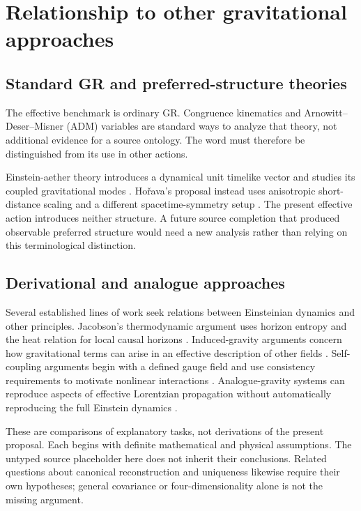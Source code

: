 \documentclass[11pt]{article}
\begin{document}
\section{Relationship to other gravitational approaches}
\subsection{Standard GR and preferred-structure theories}
The effective benchmark is ordinary GR. Congruence kinematics and Arnowitt--Deser--Misner (ADM) variables are standard ways to analyze that theory, not additional evidence for a source ontology. The word \Aether{} must therefore be distinguished from its use in other actions.

Einstein-aether theory introduces a dynamical unit timelike vector and studies its coupled gravitational modes \parencite{JacobsonMattingly2001,JacobsonMattingly2004}. Ho\v{r}ava's proposal instead uses anisotropic short-distance scaling and a different spacetime-symmetry setup \parencite{Horava2009}. The present effective action introduces neither structure. A future source completion that produced observable preferred structure would need a new analysis rather than relying on this terminological distinction.

\subsection{Derivational and analogue approaches}
Several established lines of work seek relations between Einsteinian dynamics and other principles. Jacobson's thermodynamic argument uses horizon entropy and the heat relation for local causal horizons \parencite{Jacobson1995}. Induced-gravity arguments concern how gravitational terms can arise in an effective description of other fields \parencite{Visser2002}. Self-coupling arguments begin with a defined gauge field and use consistency requirements to motivate nonlinear interactions \parencite{Deser2004}. Analogue-gravity systems can reproduce aspects of effective Lorentzian propagation without automatically reproducing the full Einstein dynamics \parencite{BarceloLiberatiVisser2011}.

These are comparisons of explanatory tasks, not derivations of the present proposal. Each begins with definite mathematical and physical assumptions. The untyped source placeholder here does not inherit their conclusions. Related questions about canonical reconstruction and uniqueness likewise require their own hypotheses; general covariance or four-dimensionality alone is not the missing argument.
\end{document}
